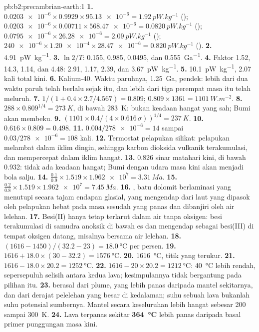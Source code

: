 \begin{solution}{pb:b2:precambrian-earth:1}
\textbf{1.} $\num{0.0203e-6}\times0.9929\times\num{95.13e-6} = \qty{1.92}{pW.kg^{-1}}$
(); $\num{0.0203e-6}\times0.00711\times\num{568.47e-6} = \qty{0.0820}{pW.kg^{-1}}$
(); $\num{0.0795e-6}\times\num{26.28e-6} = \qty{2.09}{pW.kg^{-1}}$ ();
$\num{240e-6}\times\num{1.20e-4}\times\num{28.47e-6} = \qty{0.820}{pW.kg^{-1}}$ ().
\textbf{2.} \qty{4.91}{pW.kg^{-1}}.
\textbf{3.} $\ln2/T$: 0.155, 0.985, 0.0495, dan \qty{0.555}{Ga^{-1}}.
\textbf{4.} Faktor 1.52, 14.3, 1.14, dan 4.48: 2.91, 1.17, 2.39, dan \qty{3.67}{pW.kg^{-1}}.
\textbf{5.} \qty{10.1}{pW.kg^{-1}}, 2.07 kali total kini.
\textbf{6.} Kalium-40. Waktu paruhnya, \qty{1.25}{Ga}, pendek: lebih dari dua waktu paruh
telah berlalu sejak itu, dan lebih dari tiga perempat  masa itu telah meluruh.
\textbf{7.} $1/(1 + 0.4\times2.7/4.567) = 0.809$; $0.809\times1361 = \qty{1101}{W.m^{-2}}$.
\textbf{8.} $288\times0.809^{1/4} = \qty{273}{K}$, di bawah \qty{283}{K}: bukan keadaan hangat yang sah;
Bumi akan membeku.
\textbf{9.} $(1101\times0.4/(4\times0.616\,\sigma))^{1/4} = \qty{237}{K}$.
\textbf{10.} $0.616\times0.809 = 0.498$.
\textbf{11.} $0.004/\num{278e-6} = 14$ sampai $0.03/\num{278e-6} = 108$ kali.
\textbf{12.} Termostat pelapukan silikat: pelapukan melambat dalam iklim dingin, sehingga
karbon dioksida vulkanik terakumulasi, dan mempercepat dalam iklim hangat.
\textbf{13.} 0.826 sinar matahari kini, di bawah 0.932: tidak ada keadaan hangat; Bumi dengan udara masa kini akan menjadi
bola salju.
\textbf{14.} $\frac{0.1}{0.9}\times1.519\times\num{1.962e7} = \qty{3.31}{Ma}$.
\textbf{15.} $\frac{0.2}{0.8}\times1.519\times\num{1.962e7} = \qty{7.45}{Ma}$.
\textbf{16.} , batu dolomit berlaminasi yang menutupi secara tajam endapan glasial,
yang mengendap dari laut yang dipasok oleh pelapukan hebat pada masa sesudah yang panas dan dibanjiri oleh
air lelehan.
\textbf{17.} Besi(II) hanya tetap terlarut dalam air tanpa oksigen: besi terakumulasi di
samudra anoksik di bawah es dan mengendap sebagai besi(III) di tempat oksigen datang, misalnya bersama
air lelehan.
\textbf{18.} $(1616 - 1450)/(32.2 - 23) = \qty{18.0}{\celsius}$ per persen.
\textbf{19.} $1616 + 18.0\times(30 - 32.2) = \qty{1576}{\celsius}$.
\textbf{20.} \qty{1616}{\celsius}, titik yang terukur.
\textbf{21.} $1616 - 18.0\times20.2 = \qty{1252}{\celsius}$.
\textbf{22.} $1616 - 20\times20.2 = \qty{1212}{\celsius}$: \qty{40}{\celsius} lebih rendah, sepersepuluh
selisih antara kedua lava; kesimpulannya tidak bergantung pada pilihan itu.
\textbf{23.}  berasal dari plume, yang lebih panas daripada mantel sekitarnya, dan dari derajat pelelehan
yang besar di kedalaman; suhu sebuah lava bukanlah suhu potensial sumbernya.
Mantel secara keseluruhan lebih hangat sebesar 200 sampai \qty{300}{K}.
\textbf{24.} Lava  terpanas sekitar \textbf{\qty{364}{\celsius}} lebih panas daripada
basal primer punggungan masa kini.
\end{solution}
